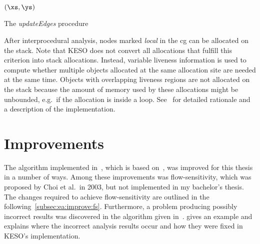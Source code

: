 			\begin{algorithm}

				\BlankLine
				\DontPrintSemicolon
				\updateEdges$\left( \xs, \ys \right)$\;
				\PrintSemicolon

				\caption[The \emph{updateEdges} procedure]{The \emph{updateEdges} procedure~\cite[Alg. 3]{lang:12}}
				\label{algo:ea:basics:updateEdges}
			\end{algorithm}

			After interprocedural analysis, nodes marked \emph{local} in the \gls{cg} can be allocated on the stack. Note that
			KESO does not convert all allocations that fulfill this criterion into stack allocations. Instead, variable
			liveness information is used to compute whether multiple objects allocated at the same allocation site are needed
			at the same time. Objects with overlapping liveness regions are not allocated on the stack because the amount of
			memory used by these allocations might be unbounded, e.g.\ if the allocation is inside a loop.
			See~\cite[Sec.~3.3]{lang:12} for detailed rationale and a description of the implementation.

	\section{Improvements}
		\label{sec:ea:improve}
		The algorithm implemented in~\cite{lang:12}, which is based on~\cite{choi:03:toplas}, was improved for this thesis
		in a number of ways. Among these improvements was flow-sensitivity, which was proposed by Choi et al.\ in 2003, but
		not implemented in my bachelor's thesis. The changes required to achieve flow-sensitivity are outlined in the
		following~\cref{subsec:ea:improve:fs}. Furthermore, a problem producing possibly incorrect
		results was discovered in the algorithm given in~\cite{choi:03:toplas}.  gives an
		example and explains where the incorrect analysis results occur and how they were fixed in KESO's implementation.

